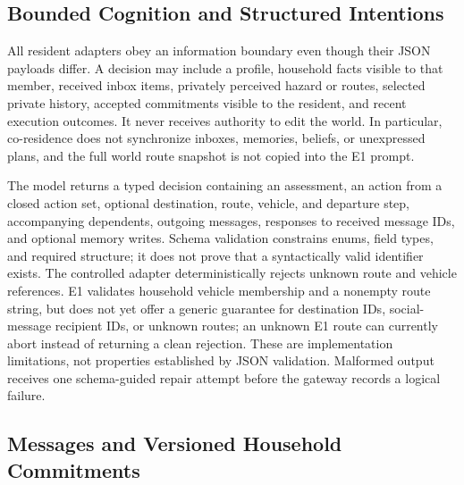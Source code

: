 \documentclass[journal]{IEEEtran}
\begin{document}
\subsection{Bounded Cognition and Structured Intentions}

All resident adapters obey an information boundary even though their JSON
payloads differ. A decision may include a profile, household facts visible to
that member, received inbox items, privately perceived hazard or routes,
selected private history, accepted commitments visible to the resident, and
recent execution outcomes. It never receives authority to edit the world. In
particular, co-residence does not synchronize inboxes, memories, beliefs, or
unexpressed plans, and the full world route snapshot is not copied into the E1
prompt.

The model returns a typed decision containing an assessment, an action from a
closed action set, optional destination, route, vehicle, and departure step,
accompanying dependents, outgoing messages, responses to received message IDs,
and optional memory writes. Schema validation constrains enums, field types,
and required structure; it does not prove that a syntactically valid identifier
exists. The controlled adapter deterministically rejects unknown route and
vehicle references. E1 validates household vehicle membership and a nonempty
route string, but does not yet offer a generic guarantee for destination IDs,
social-message recipient IDs, or unknown routes; an unknown E1 route can
currently abort instead of returning a clean rejection. These are implementation
limitations, not properties established by JSON validation. Malformed output
receives one schema-guided repair attempt before the gateway records a logical
failure.

\subsection{Messages and Versioned Household Commitments}
\end{document}
